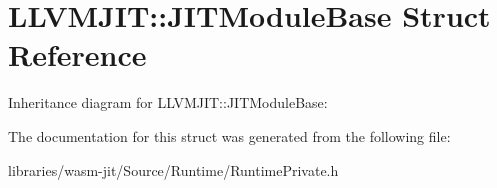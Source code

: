 \hypertarget{struct_l_l_v_m_j_i_t_1_1_j_i_t_module_base}{}\section{L\+L\+V\+M\+J\+IT\+:\+:J\+I\+T\+Module\+Base Struct Reference}
\label{struct_l_l_v_m_j_i_t_1_1_j_i_t_module_base}


Inheritance diagram for L\+L\+V\+M\+J\+IT\+:\+:J\+I\+T\+Module\+Base\+:


The documentation for this struct was generated from the following file\+:\begin{DoxyCompactItemize}
\item 
libraries/wasm-\/jit/\+Source/\+Runtime/Runtime\+Private.\+h\end{DoxyCompactItemize}

